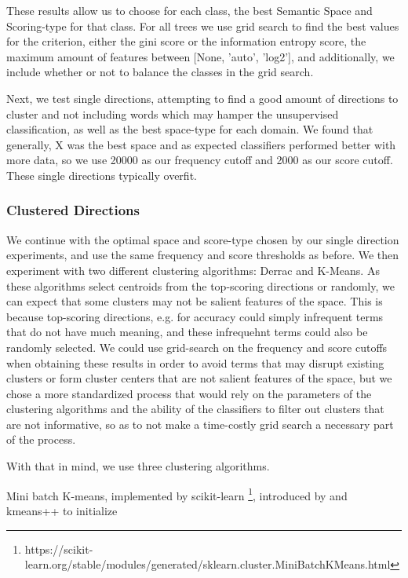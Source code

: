 These results allow us to choose for each class, the best Semantic Space and Scoring-type for that class. For all trees we use grid search to find the best values for the criterion, either the gini score or the information entropy score, the maximum amount of features between [None, 'auto', 'log2'], and additionally, we include whether or not to balance the classes in the grid search.



Next, we test single directions, attempting to find a good amount of directions to cluster and not including words which may hamper the unsupervised classification, as well as the best space-type for each domain. We found that generally, X was the best space and as expected classifiers performed better with more data, so we use 20000 as our frequency cutoff and 2000 as our score cutoff. These single directions typically overfit.


\subsubsection{Clustered Directions}
We continue with the optimal space and score-type chosen by our single direction experiments, and use the same frequency and score thresholds as before. We then experiment with two different clustering algorithms: Derrac and K-Means. As these algorithms select centroids from the top-scoring directions or randomly, we can expect that some clusters may not be salient features of the space. This is because top-scoring directions, e.g. for accuracy could simply infrequent terms that do not have much meaning, and these infrequehnt terms could also be randomly selected. We could use grid-search on the frequency and score cutoffs when obtaining these results in order to avoid terms that may disrupt existing clusters or form cluster centers that are not salient features of the space, but we chose a more standardized process that would rely on the parameters of the clustering algorithms and the ability of the classifiers to filter out clusters that are not informative, so as to not make a time-costly grid search a necessary part of the process.

With that in mind, we use three clustering algorithms.

Mini batch K-means, implemented by scikit-learn \footnote{https://scikit-learn.org/stable/modules/generated/sklearn.cluster.MiniBatchKMeans.html}, introduced by \cite{Sculley2010} and kmeans++ to initialize \cite{Arthur}

